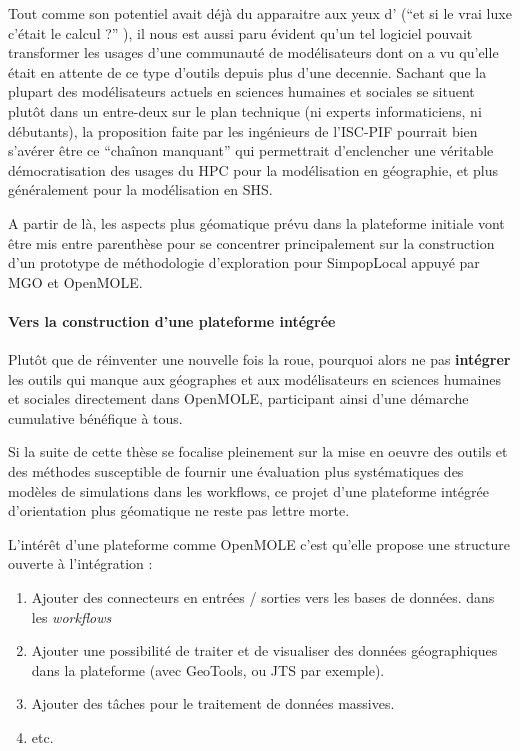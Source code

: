 Tout comme son potentiel avait déjà du apparaitre aux yeux d'\textcite[19-26]{Banos2013} (\enquote{et si le vrai luxe c'était le calcul ?} ), il nous est  aussi paru évident qu'un tel logiciel pouvait transformer les usages d'une communauté de modélisateurs dont on a vu qu'elle était en attente de ce type d'outils depuis plus d'une decennie. Sachant que la plupart des modélisateurs actuels en sciences humaines et sociales se situent plutôt dans un entre-deux sur le plan technique (ni experts informaticiens, ni débutants), la proposition faite par les ingénieurs de l'ISC-PIF pourrait bien s'avérer être ce \enquote{chaînon manquant} qui permettrait d'enclencher une véritable démocratisation des usages du HPC pour la modélisation en géographie, et plus généralement pour la modélisation en SHS.

A partir de là, les aspects plus géomatique prévu dans la plateforme initiale vont être mis entre parenthèse pour se concentrer principalement sur la construction d'un prototype de méthodologie d'exploration pour SimpopLocal appuyé par MGO et OpenMOLE. %

\paragraph {Vers la construction d'une plateforme intégrée}

Plutôt que de réinventer une nouvelle fois la roue, pourquoi alors ne pas \textbf{intégrer} les outils qui manque aux géographes et aux modélisateurs en sciences humaines et sociales directement dans OpenMOLE, participant ainsi d'une démarche cumulative bénéfique à tous.

Si la suite de cette thèse se focalise pleinement sur la mise en oeuvre des outils et des méthodes susceptible de fournir une évaluation plus systématiques des modèles de simulations dans les workflows, ce projet d'une plateforme intégrée d'orientation plus géomatique ne reste pas lettre morte.

L'intérêt d'une plateforme comme OpenMOLE c'est qu'elle propose une structure ouverte à l'intégration : 

\begin{enumerate}[label=(\alph*),labelindent=\parindent,leftmargin=*]
\item Ajouter des connecteurs en entrées / sorties vers les bases de données. dans les \textit{workflows}
\item Ajouter une possibilité de traiter et de visualiser des données géographiques dans la plateforme (avec GeoTools, ou JTS par exemple).
\item Ajouter des tâches pour le traitement de données massives.
\item etc.
\end{enumerate}

